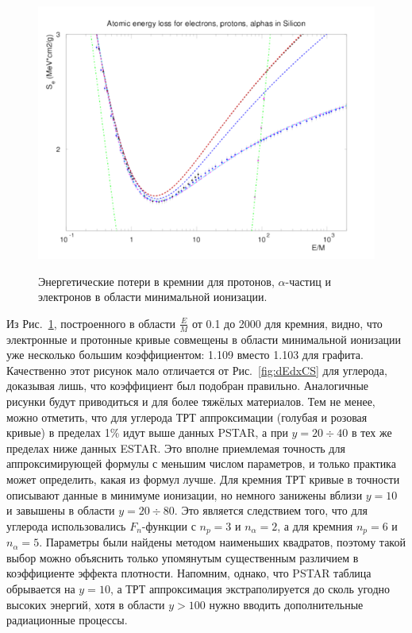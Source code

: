\documentclass[a4paper,12pt]{article}
\begin{document}
\begin{large}
  \begin{figure}[ht]
    {
       \includegraphics[width=0.99\linewidth]{images/epa_si_s}
    }
    \caption{Энергетические потери в кремнии для протонов, $\alpha$-частиц и электронов в области минимальной ионизации.}
    \label{fig:dEdxSiS}
  \end{figure}
  Из Рис.~\ref{fig:dEdxSiS}, построенного в области $\frac{E}{M}$ от 0.1 до 2000 для кремния, видно, что электронные и протонные кривые совмещены в области минимальной ионизации уже несколько большим коэффициентом: 1.109 вместо 1.103 для графита.
  Качественно этот рисунок мало отличается от Рис.~\ref{fig:dEdxCS} для углерода, доказывая лишь, что коэффициент был подобран правильно.
  Аналогичные рисунки будут приводиться и для более тяжёлых материалов.
  Тем не менее, можно отметить, что для углерода ТРТ аппроксимации (голубая и розовая кривые) в пределах 1\% идут выше данных PSTAR, а при $y=20\div 40$ в тех же пределах ниже данных ESTAR.
  Это вполне приемлемая точность для аппроксимирующей формулы с меньшим числом параметров, и только практика может определить, какая из формул лучше.
  Для кремния ТРТ кривые в точности описывают данные в минимуме ионизации, но немного занижены вблизи $y=10$ и завышены в области $y=20\div 80$.
  Это является следствием того, что для углерода использовались $F_n$-функции с $n_p=3$ и $n_\alpha=2$, а для кремния $n_p=6$ и $n_\alpha=5$.
  Параметры были найдены методом наименьших квадратов, поэтому такой выбор можно объяснить только упомянутым существенным различием в коэффициенте эффекта плотности.
  Напомним, однако, что PSTAR таблица обрывается на $y=10$, а ТРТ аппроксимация экстраполируется до сколь угодно высоких энергий, хотя в области $y>100$ нужно вводить дополнительные радиационные процессы. 
  

\end{large}
\end{document}
